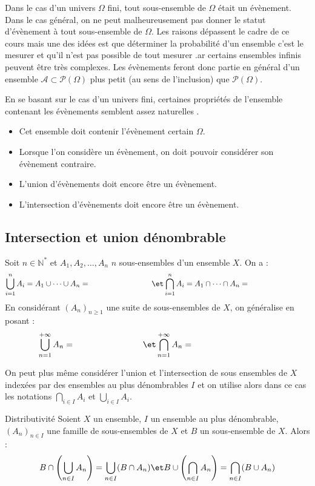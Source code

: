 \documentclass[french,11pt,twoside]{VcCours}
\begin{document}
Dans le cas d'un univers $\Omega$ fini, tout sous-ensemble de $\Omega$ était un évènement. Dans le cas général, on ne peut malheureusement pas donner le statut d'évènement à tout sous-ensemble de $\Omega$. Les raisons dépassent le cadre de ce cours mais une des idées est que déterminer la probabilité d'un ensemble c'est le mesurer et qu'il n'est pas possible de \og tout mesurer \fg{}.ar certains ensembles infinis peuvent être très complexes. Les évènements feront donc partie en général d'un ensemble $\mathcal{A} \subset \mathcal{P}(\Omega)$ plus petit (au sens de l'inclusion) que $\mathcal{P}(\Omega)$.


En se basant sur le cas d'un univers fini, certaines propriétés de l'ensemble contenant les évènements semblent assez \og naturelles \fg{}.



\begin{itemize}
\item Cet ensemble doit contenir l'évènement certain $\Omega$.
\item Lorsque l'on considère un évènement, on doit pouvoir considérer son évènement contraire.
\item L'union d'évènements doit encore être un évènement.
\item L'intersection d'évènements doit encore être un évènement.
\end{itemize}

\subsection{Intersection et union dénombrable}

Soit $n \in \mathbb{N}^*$ et $A_1, A_2, \ldots, A_n$ $n$ sous-ensembles d'un ensemble $X$. On a :
$$ \bigcup_{i=1}^n A_i = A_1 \cup \cdots \cup A_n =  \qquad \qquad \qquad \qquad \et \bigcap_{i=1}^n A_i = A_1 \cap \cdots \cap A_n =\qquad \qquad \qquad \qquad$$
En considérant $(A_n)_{n \geq 1}$ une suite de sous-ensembles de $X$, on généralise en posant :
$$ \bigcup_{n=1}^{+ \infty} A_n =  \qquad \qquad \qquad \qquad \et \bigcap_{n=1}^{+ \infty} A_n  =\qquad \qquad \qquad  \qquad\qquad$$

On peut plus même considérer l'union et l'intersection de sous ensembles de $X$ indexées par des ensembles au plus dénombrables $I$ et on utilise alors dans ce cas les notations $\bigcap_{i \in I} A_i$ et $\bigcup_{i \in I} A_i$.

\begin{Proposition}{Distributivité}
Soient  $X$ un ensemble, $I$ un ensemble au plus dénombrable, $(A_n)_{n\in I}$ une famille de sous-ensembles de $X$ et $B$ un sous-ensemble de $X$. Alors :
 $$ B \cap \left(\bigcup_{n\in I} A_n \right) = \bigcup_{n\in I} (B \cap A_n) \et  B \cup \left(\bigcap_{n\in I} A_n \right) = \bigcap_{n\in I} (B \cup A_n) $$
\end{Proposition}
\end{document}
